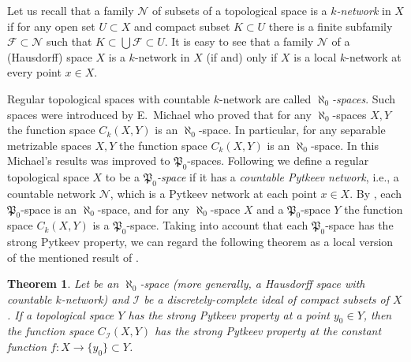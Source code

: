 \documentclass{amsart}
\newtheorem{theorem}{Theorem}[section]
\theoremstyle{definition}
\begin{document}
Let us recall \cite[\S11]{Gru} that a family $\mathcal N$ of subsets of a topological space is a {\em $k$-network} in $X$ if for any open set $U\subset X$ and compact subset $K\subset U$ there is a finite subfamily ${\mathcal F}\subset \mathcal N$ such that $K\subset\bigcup{\mathcal F}\subset U$.
It is easy to see that a family $\mathcal N$ of a (Hausdorff) space $X$ is a $k$-network in $X$ (if and) only if $X$ is a local $k$-network at every point $x\in X$.

Regular topological spaces with countable $k$-network are called {\em $\aleph_0$-spaces}. Such spaces were introduced by E.~Michael \cite{Mi} who proved that for any $\aleph_0$-spaces $X,Y$ the function space $C_k(X,Y)$ is an $\aleph_0$-space. In particular, for any separable metrizable spaces $X,Y$ the function space $C_k(X,Y)$ is an $\aleph_0$-space. In \cite{Ban} this Michael's results was improved  to ${\mathfrak P}_0$-spaces. Following \cite{Ban} we define a regular topological space $X$ to be a {\em ${\mathfrak P}_0$-space} if it has a {\em countable Pytkeev network}, i.e., a countable network $\mathcal N$, which is a Pytkeev network at each point $x\in X$. By \cite{Ban}, each ${\mathfrak P}_0$-space is an $\aleph_0$-space, and for any $\aleph_0$-space $X$ and a ${\mathfrak P}_0$-space $Y$ the function space $C_k(X,Y)$ is a ${\mathfrak P}_0$-space. Taking into account that each ${\mathfrak P}_0$-space has the strong Pytkeev property, we can regard the following theorem as a local version of the mentioned result of \cite{Ban}.

\begin{theorem}\label{main} Let be an $\aleph_0$-space (more generally, a Hausdorff space with countable $k$-network) and  ${\mathcal I}$ be a discretely-complete ideal of compact subsets of $X$. If a topological space $Y$ has the strong Pytkeev property at a point $y_0\in Y$, then the function space $C_{\mathcal I}(X,Y)$ has the strong Pytkeev property at the constant function $f:X\to\{y_0\}\subset Y$.
\end{theorem}
\end{document}
